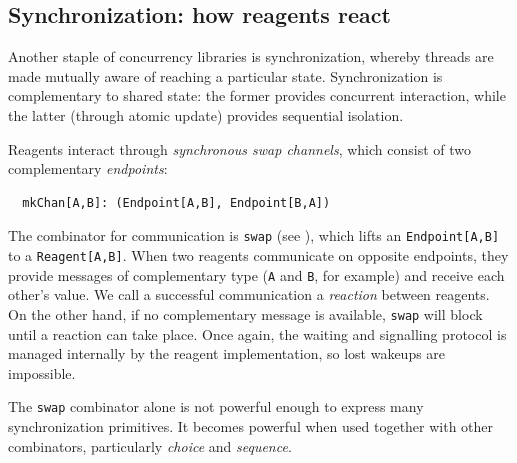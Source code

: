 \documentclass[preprint,nocopyrightspace]{sigplanconf}
\begin{document}

\subsection{Synchronization: how reagents react}
\label{sec:sync}


Another staple of concurrency libraries is synchronization, whereby
threads are made mutually aware of reaching a particular state.
Synchronization is complementary to shared state: the former
provides concurrent interaction, while the latter (through atomic
update) provides sequential isolation.  %

Reagents interact through \emph{synchronous swap channels}, which
consist of two complementary \emph{endpoints}:
\begin{lstlisting}
  mkChan[A,B]: (Endpoint[A,B], Endpoint[B,A])
\end{lstlisting}
The combinator for communication is \lstinline{swap} (see
), which lifts an \lstinline{Endpoint[A,B]} to a
\lstinline{Reagent[A,B]}.  When two reagents communicate on opposite
endpoints, they provide messages of complementary type (\lstinline{A}
and \lstinline{B}, for example) and receive each other's value.  We
call a successful communication a \emph{reaction} between reagents.
On the other hand, if no complementary message is available,
\lstinline{swap} will block until a reaction can take place.  Once
again, the waiting and signalling protocol is managed internally by
the reagent implementation, so lost wakeups are impossible.

The \lstinline{swap} combinator alone is not powerful enough to
express many synchronization primitives.  It becomes powerful when
used together with other combinators, particularly \emph{choice} and
\emph{sequence}.

\end{document}
